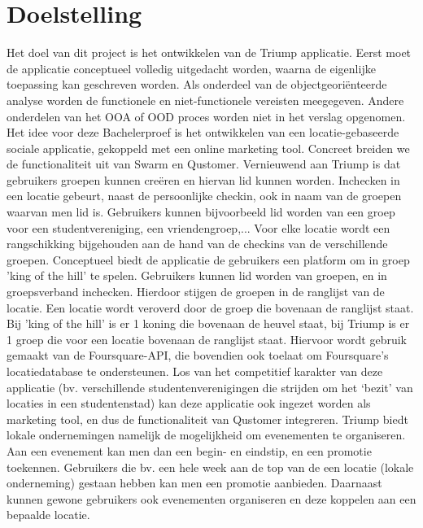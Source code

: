 
\chapter{Doelstelling}



Het doel van dit project is het ontwikkelen van de Triump applicatie. Eerst moet de applicatie conceptueel volledig uitgedacht worden, waarna de eigenlijke toepassing kan geschreven worden. Als onderdeel van de objectgeoriënteerde analyse worden de functionele en niet-functionele vereisten meegegeven. Andere onderdelen van het OOA of OOD proces worden niet in het verslag opgenomen.
Het idee voor deze Bachelerproef is het ontwikkelen van een locatie-gebaseerde sociale applicatie, gekoppeld met een online marketing tool. Concreet breiden we de functionaliteit uit van Swarm en Qustomer. Vernieuwend aan Triump is dat gebruikers groepen kunnen creëren en hiervan lid kunnen worden. Inchecken in een locatie gebeurt, naast de persoonlijke checkin, ook in naam van de groepen waarvan men lid is. Gebruikers kunnen bijvoorbeeld lid worden van een groep voor een studentvereniging, een vriendengroep,...
Voor elke locatie wordt een rangschikking bijgehouden aan de hand van de checkins van de verschillende groepen. Conceptueel biedt de applicatie de gebruikers een platform om in groep 'king of the hill' te spelen. Gebruikers kunnen lid worden van groepen, en in groepsverband inchecken. Hierdoor stijgen de groepen in de ranglijst van de locatie. Een locatie wordt veroverd door de groep die bovenaan de ranglijst staat.
Bij 'king of the hill' is er 1 koning die bovenaan de heuvel staat, bij Triump is er 1 groep die voor een locatie bovenaan de ranglijst staat.
Hiervoor wordt gebruik gemaakt van de Foursquare-API, die bovendien ook toelaat om Foursquare's locatiedatabase te ondersteunen.
Los van het competitief karakter van deze applicatie (bv. verschillende studentenverenigingen die strijden om het ‘bezit’ van locaties in een studentenstad) kan deze applicatie ook ingezet worden als marketing tool, en dus de functionaliteit van Qustomer integreren.
Triump biedt lokale ondernemingen namelijk de mogelijkheid om evenementen te organiseren. Aan een evenement kan men dan een begin- en eindstip, en een promotie toekennen. Gebruikers die bv. een hele week aan de top van de een locatie (lokale onderneming) gestaan hebben kan men een promotie aanbieden. Daarnaast kunnen gewone gebruikers ook evenementen organiseren en deze koppelen aan een bepaalde locatie.
